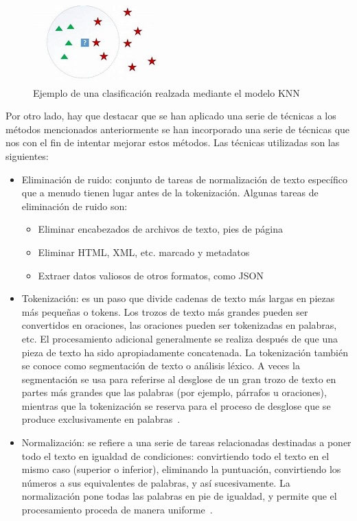\documentclass[conference,a4paper]{IEEEtran}
\begin{document}
\begin{figure}
  \centering
  \includegraphics{knn}
  \caption{Ejemplo de una clasificación realzada mediante el modelo KNN}
  \label{fig:knn}
\end{figure}

Por otro lado, hay que destacar que se han aplicado una serie de técnicas a los métodos mencionados anteriormente se han incorporado una serie de  técnicas que nos con el fin de intentar mejorar estos métodos. Las técnicas utilizadas son las siguientes:
                          
\begin{itemize}
\item Eliminación de ruido: conjunto de tareas de normalización de texto específico que a menudo tienen lugar antes de la tokenización. Algunas tareas de eliminación de ruido son:
\begin{itemize}
\item Eliminar encabezados de archivos de texto, pies de página
\item Eliminar HTML, XML, etc. marcado y metadatos
\item Extraer datos valiosos de otros formatos, como JSON 
~\cite{b8}
\end{itemize} 

\item Tokenización: es un paso que divide cadenas de texto más largas en piezas más pequeñas o tokens. Los trozos de texto más grandes pueden ser convertidos en oraciones, las oraciones pueden ser tokenizadas en palabras, etc. El procesamiento adicional generalmente se realiza después de que una pieza de texto ha sido apropiadamente concatenada. La tokenización también se conoce como segmentación de texto o análisis léxico. A veces la segmentación se usa para referirse al desglose de un gran trozo de texto en partes más grandes que las palabras (por ejemplo, párrafos u oraciones), mientras que la tokenización se reserva para el proceso de desglose que se produce exclusivamente en palabras~\cite{b9}.

\item Normalización: se refiere a una serie de tareas relacionadas destinadas a poner todo el texto en igualdad de condiciones: convirtiendo todo el texto en el mismo caso (superior o inferior), eliminando la puntuación, convirtiendo los números a sus equivalentes de palabras, y así sucesivamente. La normalización pone todas las palabras en pie de igualdad, y permite que el procesamiento proceda de manera uniforme~\cite{b10}.
\end{itemize}                                                         
                                                           
\end{document}
